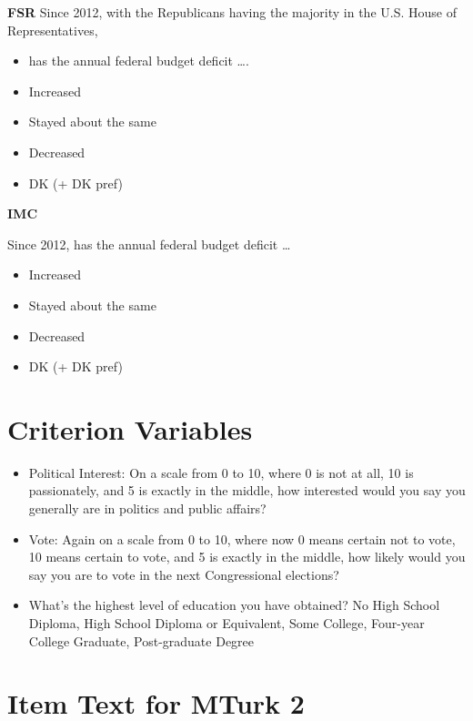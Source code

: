 \begin{itemize}
\textbf{FSR}\newline
Since 2012, with the Republicans having the majority in the U.S. House of
Representatives,
\begin{itemize}
	\item has the annual federal budget deficit \ldots.
	\item Increased
	\item Stayed about the same
	\item Decreased
	\item DK (+ DK pref)
\end{itemize}

\textbf{IMC}\newline

Since 2012, has the annual federal budget deficit \ldots
\begin{itemize}
	\item Increased
	\item Stayed about the same
	\item Decreased
	\item DK (+ DK pref)
\end{itemize}
\end{itemize}

\newpage

\clearpage
\section{Criterion Variables}\label{si:mturk1_criteria}
\begin{itemize}

    \item Political Interest: On a scale from 0 to 10, where 0 is not at all, 10 is passionately, and 5 is exactly in the middle, how interested would you say you generally are in politics and public affairs?

    \item Vote: Again on a scale from 0 to 10, where now 0 means certain not to vote, 10 means certain to vote, and 5 is exactly in the middle, how likely would you say you are to vote in the next Congressional elections?

    \item What's the highest level of education you have obtained? No High School Diploma, High School Diploma or Equivalent, Some College, Four-year College Graduate, Post-graduate Degree
\end{itemize}

\clearpage
\section{Item Text for MTurk 2}\label{si:mturk2}

